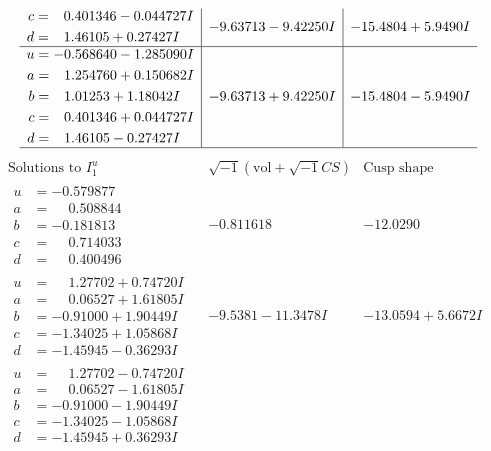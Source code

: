 \documentclass[1p]{elsarticle_modified}
\theoremstyle{definition}
\newcommand{\I}{\sqrt{-1}}
\begin{document}
$$\begin{array}{c|c|c}
\begin{aligned}
c &= \phantom{-}0.401346 - 0.044727 I \\
d &= \phantom{-}1.46105 + 0.27427 I\end{aligned}
 & -9.63713 - 9.42250 I & -15.4804 + 5.9490 I \\ \hline\begin{aligned}
u &= -0.568640 - 1.285090 I \\
a &= \phantom{-}1.254760 + 0.150682 I \\
b &= \phantom{-}1.01253 + 1.18042 I \\
c &= \phantom{-}0.401346 + 0.044727 I \\
d &= \phantom{-}1.46105 - 0.27427 I\end{aligned}
 & -9.63713 + 9.42250 I & -15.4804 - 5.9490 I\\
 \hline 
 \end{array}$$\newpage$$\begin{array}{c|c|c}  
\text{Solutions to }I^u_{1}& \I (\text{vol} + \sqrt{-1}CS) & \text{Cusp shape}\\
 \hline 
\begin{aligned}
u &= -0.579877\phantom{ +0.000000I} \\
a &= \phantom{-}0.508844\phantom{ +0.000000I} \\
b &= -0.181813\phantom{ +0.000000I} \\
c &= \phantom{-}0.714033\phantom{ +0.000000I} \\
d &= \phantom{-}0.400496\phantom{ +0.000000I}\end{aligned}
 & -0.811618\phantom{ +0.000000I} & -12.0290\phantom{ +0.000000I} \\ \hline\begin{aligned}
u &= \phantom{-}1.27702 + 0.74720 I \\
a &= \phantom{-}0.06527 + 1.61805 I \\
b &= -0.91000 + 1.90449 I \\
c &= -1.34025 + 1.05868 I \\
d &= -1.45945 - 0.36293 I\end{aligned}
 & -9.5381 - 11.3478 I & -13.0594 + 5.6672 I \\ \hline\begin{aligned}
u &= \phantom{-}1.27702 - 0.74720 I \\
a &= \phantom{-}0.06527 - 1.61805 I \\
b &= -0.91000 - 1.90449 I \\
c &= -1.34025 - 1.05868 I \\
d &= -1.45945 + 0.36293 I\end{aligned}

\end{array}$$
\end{document}
